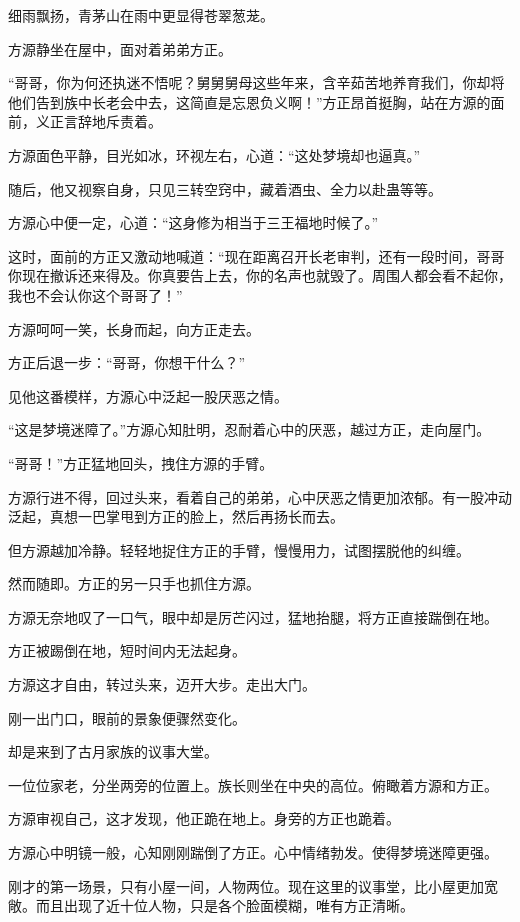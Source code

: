 
\begin{this_body}

细雨飘扬，青茅山在雨中更显得苍翠葱茏。

方源静坐在屋中，面对着弟弟方正。

“哥哥，你为何还执迷不悟呢？舅舅舅母这些年来，含辛茹苦地养育我们，你却将他们告到族中长老会中去，这简直是忘恩负义啊！”方正昂首挺胸，站在方源的面前，义正言辞地斥责着。

方源面色平静，目光如冰，环视左右，心道：“这处梦境却也逼真。”

随后，他又视察自身，只见三转空窍中，藏着酒虫、全力以赴蛊等等。

方源心中便一定，心道：“这身修为相当于三王福地时候了。”

这时，面前的方正又激动地喊道：“现在距离召开长老审判，还有一段时间，哥哥你现在撤诉还来得及。你真要告上去，你的名声也就毁了。周围人都会看不起你，我也不会认你这个哥哥了！”

方源呵呵一笑，长身而起，向方正走去。

方正后退一步：“哥哥，你想干什么？”

见他这番模样，方源心中泛起一股厌恶之情。

“这是梦境迷障了。”方源心知肚明，忍耐着心中的厌恶，越过方正，走向屋门。

“哥哥！”方正猛地回头，拽住方源的手臂。

方源行进不得，回过头来，看着自己的弟弟，心中厌恶之情更加浓郁。有一股冲动泛起，真想一巴掌甩到方正的脸上，然后再扬长而去。

但方源越加冷静。轻轻地捉住方正的手臂，慢慢用力，试图摆脱他的纠缠。

然而随即。方正的另一只手也抓住方源。

方源无奈地叹了一口气，眼中却是厉芒闪过，猛地抬腿，将方正直接踹倒在地。

方正被踢倒在地，短时间内无法起身。

方源这才自由，转过头来，迈开大步。走出大门。

刚一出门口，眼前的景象便骤然变化。

却是来到了古月家族的议事大堂。

一位位家老，分坐两旁的位置上。族长则坐在中央的高位。俯瞰着方源和方正。

方源审视自己，这才发现，他正跪在地上。身旁的方正也跪着。

方源心中明镜一般，心知刚刚踹倒了方正。心中情绪勃发。使得梦境迷障更强。

刚才的第一场景，只有小屋一间，人物两位。现在这里的议事堂，比小屋更加宽敞。而且出现了近十位人物，只是各个脸面模糊，唯有方正清晰。


\end{this_body}
